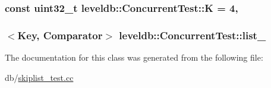 \subsubsection[{K}]{\setlength{\rightskip}{0pt plus 5cm}const {\bf uint32\+\_\+t} leveldb\+::\+Concurrent\+Test\+::\+K = 4\hspace{0.3cm}{\ttfamily [static]}, {\ttfamily [private]}}\label{classleveldb_1_1_concurrent_test_a7ec0efa701eb4bc34cff1f7a9c6ba6bd}
\hypertarget{classleveldb_1_1_concurrent_test_a464336022164fd66379851cec882f237}{}
\subsubsection[{list\+\_\+}]{$<${\bf Key}, {\bf Comparator}$>$ leveldb\+::\+Concurrent\+Test\+::list\+\_\+\hspace{0.3cm}{\ttfamily [private]}}\label{classleveldb_1_1_concurrent_test_a464336022164fd66379851cec882f237}


The documentation for this class was generated from the following file\+:\begin{DoxyCompactItemize}
\item 
db/\hyperlink{skiplist__test_8cc}{skiplist\+\_\+test.\+cc}\end{DoxyCompactItemize}
